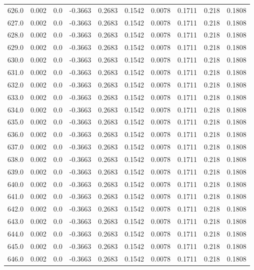 \begin{longtable}{lrrrrrrrrr}
626.0 & 0.002 & 0.0 & -0.3663 & 0.2683 & 0.1542 & 0.0078 & 0.1711 & 0.218 & 0.1808 \\
627.0 & 0.002 & 0.0 & -0.3663 & 0.2683 & 0.1542 & 0.0078 & 0.1711 & 0.218 & 0.1808 \\
628.0 & 0.002 & 0.0 & -0.3663 & 0.2683 & 0.1542 & 0.0078 & 0.1711 & 0.218 & 0.1808 \\
629.0 & 0.002 & 0.0 & -0.3663 & 0.2683 & 0.1542 & 0.0078 & 0.1711 & 0.218 & 0.1808 \\
630.0 & 0.002 & 0.0 & -0.3663 & 0.2683 & 0.1542 & 0.0078 & 0.1711 & 0.218 & 0.1808 \\
631.0 & 0.002 & 0.0 & -0.3663 & 0.2683 & 0.1542 & 0.0078 & 0.1711 & 0.218 & 0.1808 \\
632.0 & 0.002 & 0.0 & -0.3663 & 0.2683 & 0.1542 & 0.0078 & 0.1711 & 0.218 & 0.1808 \\
633.0 & 0.002 & 0.0 & -0.3663 & 0.2683 & 0.1542 & 0.0078 & 0.1711 & 0.218 & 0.1808 \\
634.0 & 0.002 & 0.0 & -0.3663 & 0.2683 & 0.1542 & 0.0078 & 0.1711 & 0.218 & 0.1808 \\
635.0 & 0.002 & 0.0 & -0.3663 & 0.2683 & 0.1542 & 0.0078 & 0.1711 & 0.218 & 0.1808 \\
636.0 & 0.002 & 0.0 & -0.3663 & 0.2683 & 0.1542 & 0.0078 & 0.1711 & 0.218 & 0.1808 \\
637.0 & 0.002 & 0.0 & -0.3663 & 0.2683 & 0.1542 & 0.0078 & 0.1711 & 0.218 & 0.1808 \\
638.0 & 0.002 & 0.0 & -0.3663 & 0.2683 & 0.1542 & 0.0078 & 0.1711 & 0.218 & 0.1808 \\
639.0 & 0.002 & 0.0 & -0.3663 & 0.2683 & 0.1542 & 0.0078 & 0.1711 & 0.218 & 0.1808 \\
640.0 & 0.002 & 0.0 & -0.3663 & 0.2683 & 0.1542 & 0.0078 & 0.1711 & 0.218 & 0.1808 \\
641.0 & 0.002 & 0.0 & -0.3663 & 0.2683 & 0.1542 & 0.0078 & 0.1711 & 0.218 & 0.1808 \\
642.0 & 0.002 & 0.0 & -0.3663 & 0.2683 & 0.1542 & 0.0078 & 0.1711 & 0.218 & 0.1808 \\
643.0 & 0.002 & 0.0 & -0.3663 & 0.2683 & 0.1542 & 0.0078 & 0.1711 & 0.218 & 0.1808 \\
644.0 & 0.002 & 0.0 & -0.3663 & 0.2683 & 0.1542 & 0.0078 & 0.1711 & 0.218 & 0.1808 \\
645.0 & 0.002 & 0.0 & -0.3663 & 0.2683 & 0.1542 & 0.0078 & 0.1711 & 0.218 & 0.1808 \\
646.0 & 0.002 & 0.0 & -0.3663 & 0.2683 & 0.1542 & 0.0078 & 0.1711 & 0.218 & 0.1808 \\

\end{longtable}
